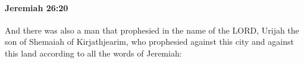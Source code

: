 
		\paragraph{Jeremiah 26:20} %
			\label{JEREMIAH-26-20}

			And there was also a man that prophesied in the name of the LORD, Urijah the son of Shemaiah of Kirjathjearim, who prophesied against this city and against this land according to all the words of Jeremiah:


